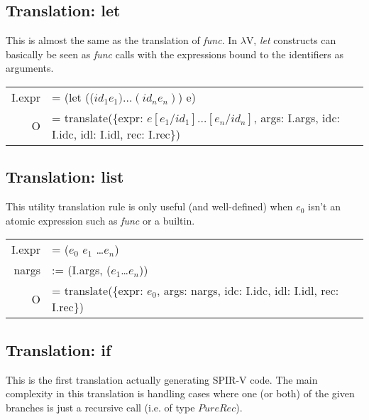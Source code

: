 \documentclass[letterpaper,12pt]{article}
\begin{document}
\subsection{Translation: let}

This is almost the same as the translation of \textit{func}.
In $\lambda$V, \textit{let} constructs can basically be seen
as \textit{func} calls with the expressions bound to the identifiers
as arguments.

\medskip
\begin{tabularx}{\linewidth}{rl}
	I.expr &= (let (($id_1 e_1) \dots (id_n e_n)$) e) \\
	O &= translate(\{expr: $e[e_1 / id_1]\dots[e_n / id_n]$, args: I.args, idc: I.idc, idl: I.idl, rec: I.rec\}) \\
\end{tabularx}

\subsection{Translation: list}

This utility translation rule is only useful (and well-defined) when $e_0$ isn't
an atomic expression such as \textit{func} or a builtin. \\

\medskip
\begin{tabularx}{\linewidth}{rl}
	I.expr &= ($e_0$ $e_1$ \dots $e_n$) \\
	nargs &:= (I.args, ($e_1$\dots$e_n$)) \\
	O &= translate(\{expr: $e_0$, args: nargs, idc: I.idc, idl: I.idl, rec: I.rec\}) \\
\end{tabularx}

\subsection{Translation: if}

This is the first translation actually generating SPIR-V code. The main
complexity in this translation is handling cases where one (or both) of the
given branches is just a recursive call (i.e. of type $PureRec$).
\end{document}
